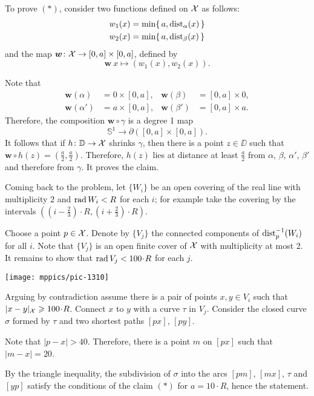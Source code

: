 To prove $({*})$, consider two functions defined on $\mathcal{X}$ as follows:
\begin{align*}
w_1(x)&=\min \{\,a,\mathrm{dist}_{\alpha}(x)\,\}
\\
w_2(x)&=\min \{\,a,\mathrm{dist}_{\beta}(x)\,\}
\end{align*}
and the map $\bm{w}\colon\mathcal{X}\to [0,a]\times[0,a]$, defined by
\[\bm{w}\:x\mapsto(w_1(x),w_2(x)).\]

Note that 
\begin{align*}
\bm{w}(\alpha)&=0\times [0,a],
&
\bm{w}(\beta)&=[0,a]\times 0,
\\
\bm{w}(\alpha')&=a\times [0,a],
&
\bm{w}(\beta')&=[0,a]\times a.
\end{align*} 
Therefore, the composition $\bm{w}\circ\gamma$ is a degree 1 map 
\[\mathbb{S}^1\to \partial([0,a]\times[0,a]).\] 
It follows that if $h\colon\mathbb{D}\to \mathcal{X}$ shrinks $\gamma$, then there is a point $z\in\DD$ such that 
$\bm{w}\circ h(z)=(\tfrac a2,\tfrac a2)$.
Therefore, $h(z)$ lies at distance at least $\tfrac a2$ from $\alpha$, $\beta$, $\alpha'$, $\beta'$
and therefore from $\gamma$.
It proves the claim.

\medskip

Coming back to the problem, let $\{W_i\}$ be an open covering of the real line with multiplicity $2$ and $\mathop{\rm rad}\nolimits W_i<R$ for each $i$;
for example take the covering by the intervals $((i-\tfrac23)\cdot R,(i+\tfrac23)\cdot R)$.

Choose a point $p\in \mathcal{X}$.
Denote by $\{V_j\}$ the connected components of $\mathrm{dist}_p^{-1}(W_i)$ for all $i$.
Note that $\{V_j\}$ is an open finite cover of $\mathcal{X}$ with multiplicity at most 2.
It remains to show that $\rad V_j<100\cdot R$ for each $j$.

\begin{Figure}
\vskip-0mm
\centering
\texttt{[image: mppics/pic-1310]}
\end{Figure}

Arguing by contradiction assume there is a pair of points  $x,y\in V_i$ 
such that $|x\z-y|_{\spc{X}}\z\ge 100\cdot R$.
Connect $x$ to $y$ with a curve $\tau$ in $V_j$.
Consider the closed curve $\sigma$ formed by $\tau$ and two shortest paths $[px]$, $[py]$.


Note that $|p-x|>40$.
Therefore, there is a point $m$ on $[px]$ such that $|m-x|=20$.

By the triangle inequality, the subdivision of $\sigma$ into the arcs $[pm]$, $[mx]$, $\tau$ and $[yp]$ satisfy the conditions of the claim $({*})$ for $a=10\cdot R$,
hence the statement.

